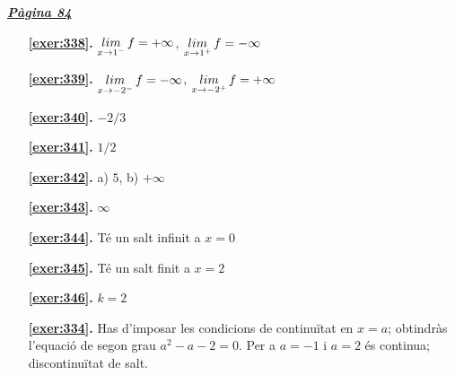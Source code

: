 
\hyperlink{page.84}{\textbf{\em Pàgina 84}}
\begin{enumerate}
\item[\fontfamily{phv}\selectfont\color{blue}\textbf{\ref{exer:338}. }] \label{ans:338} 
$\mathop{lim}\limits_{x\to 1^-} f=+\infty $, $\mathop{lim}\limits_{x\to 1^+} f=-\infty $
 \end{enumerate}
\begin{enumerate}
\item[\fontfamily{phv}\selectfont\color{blue}\textbf{\ref{exer:339}. }] \label{ans:339} 
$\mathop{lim}\limits_{x\to -2^-} f=-\infty $, $\mathop{lim}\limits_{x\to -2^+} f=+\infty $
\item[\fontfamily{phv}\selectfont\color{blue}\textbf{\ref{exer:340}. }] \label{ans:340} 
$-2/3$
\item[\fontfamily{phv}\selectfont\color{blue}\textbf{\ref{exer:341}. }] \label{ans:341} 
$1/2$
\item[\fontfamily{phv}\selectfont\color{blue}\textbf{\ref{exer:342}. }] \label{ans:342} 
a) $5$, b) $+\infty $
\item[\fontfamily{phv}\selectfont\color{blue}\textbf{\ref{exer:343}. }] \label{ans:343} 
$\infty $
\item[\fontfamily{phv}\selectfont\color{blue}\textbf{\ref{exer:344}. }] \label{ans:344} 
Té un salt infinit a $x=0$
\item[\fontfamily{phv}\selectfont\color{blue}\textbf{\ref{exer:345}. }] \label{ans:345} 
Té un salt finit a $x=2$
\item[\fontfamily{phv}\selectfont\color{blue}\textbf{\ref{exer:346}. }] \label{ans:346} 
$k=2$
\item[\fontfamily{phv}\selectfont\color{blue}\textbf{\ref{exer:334}. }] \label{ans:334} 
Has d'imposar les condicions de continuïtat en $x=a$; obtindràs l'equació de segon grau $a^2-a-2=0$. Per a $a=-1$ i $a=2$ és continua; discontinuïtat de salt.
 \end{enumerate}

 \vspace{1cm} 
 

\vspace{0.3cm}


